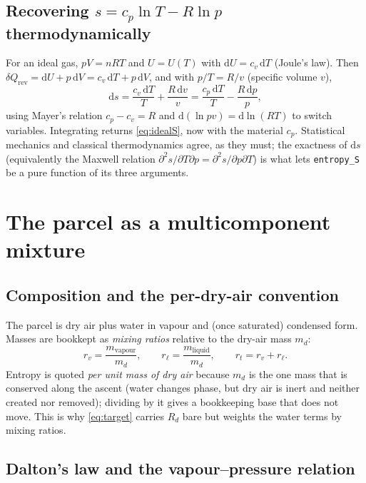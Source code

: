 \documentclass[11pt,a4paper]{article}
\theoremstyle{definition}
\newcommand{\Rd}{R_d}
\newcommand{\rt}{r_t}
\newcommand{\rvv}{r_v}
\newcommand{\rl}{r_\ell}
\newcommand{\dd}{\mathrm{d}}
\begin{document}
\subsection{Recovering \texorpdfstring{$s=c_p\ln T-R\ln p$}{s=cp lnT - R lnp} thermodynamically}

For an ideal gas, $pV=nRT$ and $U=U(T)$ with $\dd U=c_v\,\dd T$ (Joule's law).
Then $\delta Q_{\mathrm{rev}}=\dd U+p\,\dd V=c_v\,\dd T+p\,\dd V$, and with
$p/T=R/v$ (specific volume $v$),
\begin{equation}
\dd s=\frac{c_v\,\dd T}{T}+\frac{R\,\dd v}{v}
     =\frac{c_p\,\dd T}{T}-\frac{R\,\dd p}{p},
\end{equation}
using Mayer's relation $c_p-c_v=R$ and $\dd(\ln pv)=\dd\ln(RT)$ to switch
variables. Integrating returns \eqref{eq:idealS}, now with the material $c_p$.
Statistical mechanics and classical thermodynamics agree, as they must; the
exactness of $\dd s$ (equivalently the Maxwell relation
$\partial^2 s/\partial T\partial p=\partial^2 s/\partial p\partial T$) is what
lets \texttt{entropy\_S} be a pure function of its three arguments.

\section{The parcel as a multicomponent mixture}\label{sec:parcel}

\subsection{Composition and the per-dry-air convention}

The parcel is dry air plus water in vapour and (once saturated) condensed form.
Masses are bookkept as \emph{mixing ratios} relative to the dry-air mass $m_d$:
\begin{equation}
\rvv=\frac{m_{\text{vapour}}}{m_d},\qquad
\rl=\frac{m_{\text{liquid}}}{m_d},\qquad
\rt=\rvv+\rl .
\end{equation}
Entropy is quoted \emph{per unit mass of dry air} because $m_d$ is the one mass
that is conserved along the ascent (water changes phase, but dry air is inert
and neither created nor removed); dividing by it gives a bookkeeping base that
does not move. This is why \eqref{eq:target} carries $\Rd$ bare but weights the
water terms by mixing ratios.

\subsection{Dalton's law and the vapour--pressure relation}
\end{document}
